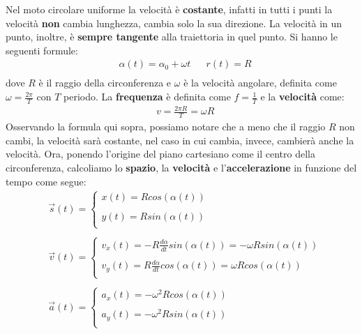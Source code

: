 				Nel moto circolare uniforme la velocità è \textbf{costante}, infatti in tutti i punti la velocità \textbf{non} cambia lunghezza, cambia solo la sua direzione. La velocità in un punto, inoltre, è \textbf{sempre tangente} alla traiettoria in quel punto.
				Si hanno le seguenti formule:
				\begin{align*}
					&\alpha(t)=\alpha_0 + \omega t
					&&r(t)=R\\
				\end{align*}
				dove $R$ è il raggio della circonferenza e $\omega$ è la velocità angolare, definita come $\omega=\frac{2\pi}{T}$ con $T$ periodo.
				La \textbf{frequenza} è definita come $f = \frac{1}{T}$ e la \textbf{velocità} come:
				\begin{align*}
					&v=\frac{2\pi R}{T}=\omega R
				\end{align*}
				Osservando la formula qui sopra, possiamo notare che a meno che il raggio $R$ non cambi, la velocità sarà costante, nel caso in cui cambia, invece, cambierà anche la velocità.
				Ora, ponendo l'origine del piano cartesiano come il centro della circonferenza, calcoliamo lo \textbf{spazio}, la \textbf{velocità} e l'\textbf{accelerazione} in funzione del tempo come segue:
				\begin{align*}
					&\vec{s}(t)=
					\begin{cases}
						x(t)=Rcos(\alpha(t))\\\\
						y(t)=Rsin(\alpha(t))\\
					\end{cases}\\\\
					&\vec{v}(t)=
					\begin{cases}
						v_x(t)=-R\frac{d\alpha}{dt}sin(\alpha(t))=-\omega Rsin(\alpha(t))\\\\
						v_y(t)=R\frac{d\alpha}{dt}cos(\alpha(t))=\omega Rcos(\alpha(t))\\
					\end{cases}\\\\
					&\vec{a}(t)=
					\begin{cases}
						a_x(t)=-\omega^2 Rcos(\alpha(t))\\\\
						a_y(t)=-\omega^2 Rsin(\alpha(t))\\
					\end{cases}\\
				\end{align*}

